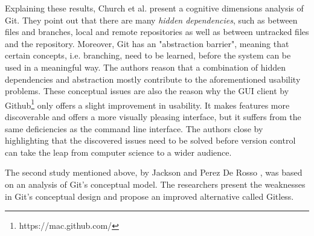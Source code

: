 Explaining these results, Church et al. present a cognitive dimensions analysis of Git. They point out that there are many \textit{hidden dependencies}, such as between files and branches, local and remote repositories as well as between untracked files and the repository. Moreover, Git has an "abstraction barrier", meaning that certain concepts, i.e. branching, need to be learned, before the system can be used in a meaningful way. The authors reason that a combination of hidden dependencies and abstraction mostly contribute to the aforementioned usability problems. These conceptual issues are also the reason why the \ac{GUI} client by Github\footnote{https://mac.github.com/} only offers a slight improvement in usability. It makes features more discoverable and offers a more visually pleasing interface, but it suffers from the same deficiencies as the command line interface. The authors close by highlighting that the discovered issues need to be solved before version control can take the leap from computer science to a wider audience.

The second study mentioned above, by Jackson and Perez De Rosso \cite{perez_de_rosso_whats_2013}, was based on an analysis of Git's conceptual model. The researchers present the weaknesses in Git's conceptual design and propose an improved alternative called Gitless.

